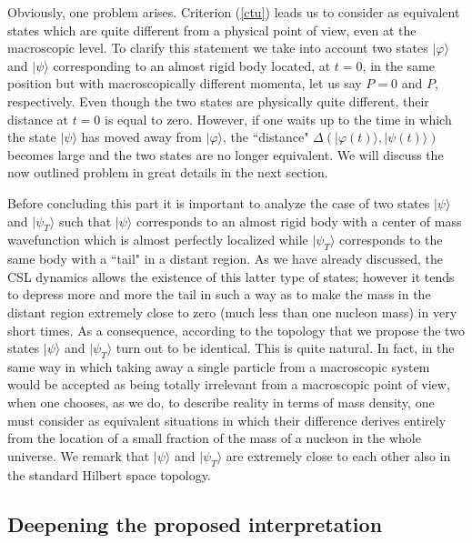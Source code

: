 \documentclass[12pt]{article}
\begin{document}
Obviously, one problem arises. Criterion (\ref{ctu}) leads us to
consider as equivalent states which are quite different from a
physical point of view, even at the macroscopic level. To clarify
this statement we take into account two states $|\varphi\rangle$
and $|\psi\rangle$ corresponding to an almost rigid body located,
at $t = 0$, in the same position but with macroscopically
different momenta, let us say $P = 0$ and $P$, respectively. Even
though the two states are physically quite different, their
distance at $t = 0$ is equal to zero. However, if one waits up to
the time in which the state $|\psi\rangle$ has moved away from
$|\varphi\rangle$, the ``distance" $\Delta(|\varphi(t)\rangle,
|\psi(t)\rangle)$ becomes large and the two states are no longer
equivalent. We will discuss the now outlined problem in great
details in the next section.

Before concluding this part it is important to analyze the case of
two states $|\psi\rangle$ and $|\psi_{T}\rangle$ such that
$|\psi\rangle$ corresponds to an almost rigid body with a center
of mass wavefunction which is almost perfectly localized while
$|\psi_{T}\rangle$ corresponds to the same body with a ``tail" in a
distant region. As we have already discussed, the CSL dynamics allows the
existence of this latter type of states; however it tends to
depress more and more the tail in such a way as to make the mass
in the distant region extremely close to zero (much less than one
nucleon mass) in very short times. As a consequence, according to
the topology that we propose the two states $|\psi\rangle$ and
$|\psi_{T}\rangle$ turn out to be identical. This is quite
natural. In fact, in the same way in which taking away a single
particle from a macroscopic system would be accepted as being
totally irrelevant from a macroscopic point of view, when one
chooses, as we do, to describe reality in terms of mass density,
one must consider as equivalent situations in which their
difference derives entirely from the location of a small fraction
of the mass of a nucleon in the whole universe. We remark that
$|\psi\rangle$ and $|\psi_{T}\rangle$ are extremely close to each
other also in the standard Hilbert space topology.


\subsection{Deepening the proposed interpretation} \label{sec125}
\end{document}
